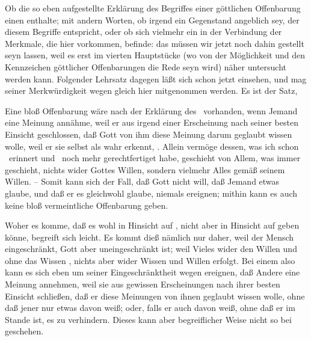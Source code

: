 Ob die so eben aufgestellte Erklärung des Begriffes einer göttlichen Offenbarung einen  enthalte; mit andern Worten, ob irgend ein Gegenstand angeblich sey, der diesem Begriffe entspricht, oder ob sich vielmehr ein  in der Verbindung der Merkmale, die hier vorkommen, befinde: das müssen wir jetzt noch dahin gestellt seyn lassen, weil es erst im vierten Hauptstücke (wo von der Möglichkeit und den Kennzeichen göttlicher Offenbarungen die Rede seyn wird) näher untersucht werden kann. Folgender Lehrsatz dagegen läßt sich schon jetzt einsehen, und mag seiner Merkwürdigkeit wegen gleich hier mitgenommen werden. Es ist der Satz, \par
Eine bloß  Offenbarung wäre nach der Erklärung des \ vorhanden, wenn Jemand eine Meinung annähme, weil er aus irgend einer Erscheinung nach seiner besten Einsicht geschlossen, daß Gott von ihm diese Meinung darum geglaubt wissen wolle, weil er sie selbst als wahr erkennt, . Allein vermöge dessen, was ich schon \ erinnert und \ noch mehr gerechtfertiget habe, geschieht von Allem, was immer geschieht, nichts wider Gottes Willen, sondern vielmehr Alles gemäß seinem Willen. -- Somit kann sich der Fall, daß Gott nicht will, daß Jemand etwas glaube, und daß er es gleichwohl glaube, niemals ereignen; mithin kann es auch keine bloß vermeintliche Offenbarung geben.
\begin{RWanm}
Woher es komme, daß es  wohl in Hinsicht auf , nicht aber in Hinsicht auf  geben könne, begreift sich leicht. Es kommt dieß nämlich nur daher, weil der Mensch eingeschränkt, Gott aber uneingeschränkt ist; weil Vieles wider den Willen und ohne das Wissen , nichts aber wider  Wissen und Willen erfolgt. Bei einem  also kann es sich eben um seiner Eingeschränktheit wegen ereignen, daß Andere eine Meinung annehmen, weil sie aus gewissen Erscheinungen nach ihrer besten Einsicht schließen, daß er diese Meinungen von ihnen geglaubt wissen wolle, ohne daß jener nur etwas davon weiß; oder, falls er auch davon weiß, ohne daß er im Stande ist, es zu verhindern. Dieses kann aber begreiflicher Weise nicht so bei  geschehen.
\end{RWanm}

